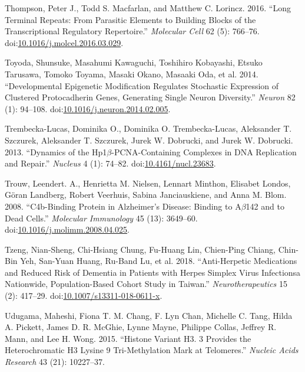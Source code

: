 \documentclass[onehalf,12pt]{beavtex}
\begin{document}
  \hypertarget{ref-ThompsonLongTerminalRepeats2016}{}
  Thompson, Peter J., Todd S. Macfarlan, and Matthew C. Lorincz. 2016.
  ``Long Terminal Repeats: From Parasitic Elements to Building Blocks of
  the Transcriptional Regulatory Repertoire.'' \emph{Molecular Cell} 62
  (5): 766--76.
  doi:\href{https://doi.org/10.1016/j.molcel.2016.03.029}{10.1016/j.molcel.2016.03.029}.
  
  \hypertarget{ref-ToyodaDevelopmentalEpigeneticModification2014}{}
  Toyoda, Shunsuke, Masahumi Kawaguchi, Toshihiro Kobayashi, Etsuko
  Tarusawa, Tomoko Toyama, Masaki Okano, Masaaki Oda, et al. 2014.
  ``Developmental Epigenetic Modification Regulates Stochastic Expression
  of Clustered Protocadherin Genes, Generating Single Neuron Diversity.''
  \emph{Neuron} 82 (1): 94--108.
  doi:\href{https://doi.org/10.1016/j.neuron.2014.02.005}{10.1016/j.neuron.2014.02.005}.
  
  \hypertarget{ref-Trembecka-LucasDynamicsHP1vPCNAcontainingcomplexes2013}{}
  Trembecka-Lucas, Dominika O., Dominika O. Trembecka-Lucas, Aleksander T.
  Szczurek, Aleksander T. Szczurek, Jurek W. Dobrucki, and Jurek W.
  Dobrucki. 2013. ``Dynamics of the Hp1\(\beta\)-PCNA-Containing Complexes
  in DNA Replication and Repair.'' \emph{Nucleus} 4 (1): 74--82.
  doi:\href{https://doi.org/10.4161/nucl.23683}{10.4161/nucl.23683}.
  
  \hypertarget{ref-TrouwC4bbindingproteinAlzheimer2008}{}
  Trouw, Leendert. A., Henrietta M. Nielsen, Lennart Minthon, Elisabet
  Londos, Göran Landberg, Robert Veerhuis, Sabina Janciauskiene, and Anna
  M. Blom. 2008. ``C4b-Binding Protein in Alzheimer's Disease: Binding to
  A\(\beta\)142 and to Dead Cells.'' \emph{Molecular Immunology} 45 (13):
  3649--60.
  doi:\href{https://doi.org/10.1016/j.molimm.2008.04.025}{10.1016/j.molimm.2008.04.025}.
  
  \hypertarget{ref-TzengAntiherpeticMedicationsReduced2018}{}
  Tzeng, Nian-Sheng, Chi-Hsiang Chung, Fu-Huang Lin, Chien-Ping Chiang,
  Chin-Bin Yeh, San-Yuan Huang, Ru-Band Lu, et al. 2018. ``Anti-Herpetic
  Medications and Reduced Risk of Dementia in Patients with Herpes Simplex
  Virus Infectionsa Nationwide, Population-Based Cohort Study in Taiwan.''
  \emph{Neurotherapeutics} 15 (2): 417--29.
  doi:\href{https://doi.org/10.1007/s13311-018-0611-x}{10.1007/s13311-018-0611-x}.
  
  \hypertarget{ref-UdugamaHistonevariantH32015}{}
  Udugama, Maheshi, Fiona T. M. Chang, F. Lyn Chan, Michelle C. Tang,
  Hilda A. Pickett, James D. R. McGhie, Lynne Mayne, Philippe Collas,
  Jeffrey R. Mann, and Lee H. Wong. 2015. ``Histone Variant H3. 3 Provides
  the Heterochromatic H3 Lysine 9 Tri-Methylation Mark at Telomeres.''
  \emph{Nucleic Acids Research} 43 (21): 10227--37.
  
\end{document}
